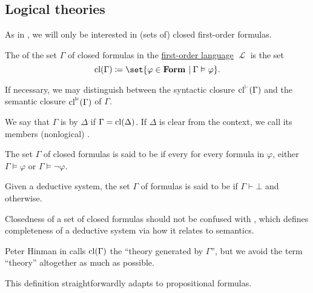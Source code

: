 \subsection{Logical theories}\label{subsec:logical_theories}

As in , we will only be interested in (sets of) closed first-order formulas.

\begin{definition}\label{def:first_order_theory}
  The  of the set \( \Gamma \) of closed formulas in the \hyperref[def:first_order_syntax]{first-order language} \( \mscrL \) is the set
  \begin{equation*}
    \cl(\Gamma) \coloneqq \set{ \varphi \in \boldop{Form} \given \Gamma \vDash \varphi }.
  \end{equation*}

  If necessary, we may distinguish between the syntactic closure \( \operatorname{cl}^\vdash(\Gamma) \) and the semantic closure \( \operatorname{cl}^\vDash(\Gamma) \) of \( \Gamma \).

  \begin{thmenum}
     We say that \( \Gamma \) is  by \( \Delta \) if \( \Gamma = \operatorname{cl}(\Delta) \). If \( \Delta \) is clear from the context, we call its members (nonlogical) .

    \medskip

     The set \( \Gamma \) of closed formulas is said to be  if every for every formula in \( \varphi \), either \( \Gamma \vDash \varphi \) or \( \Gamma \vDash \neg \varphi \).

     Given a deductive system, the set \( \Gamma \) of formulas is said to be  if \( \Gamma \vdash \bot \) and  otherwise.
  \end{thmenum}
\end{definition}
\begin{comments}
  \item Closedness of a set of closed formulas should not be confused with , which defines completeness of a deductive system via how it relates to semantics.

  \item Peter Hinman in \cite[def. 1.4.5]{Hinman2005} calls \( \operatorname{cl}(\Gamma) \) the \enquote{theory generated by \( \Gamma \)}, but we avoid the term \enquote{theory} altogether as much as possible.

  \item This definition straightforwardly adapts to propositional formulas.
\end{comments}

